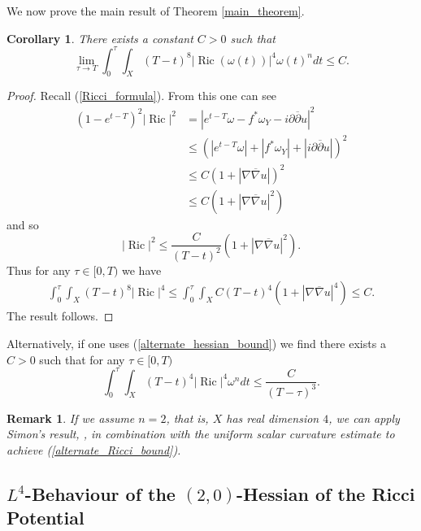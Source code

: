 \documentclass[12pt]{article}
\newtheorem{corollary}[theorem]{Corollary}
\newtheorem{remark}[theorem]{Remark}
\numberwithin{equation}{section}
\renewcommand{\d}{\partial}
\newcommand{\dbar}{\overline{\partial}}
\DeclareMathOperator{\Ric}{Ric}
\newcommand{\oo}[1]{\overline{#1}}
\begin{document}
\noindent We now prove the main result of Theorem \ref{main_theorem}. 

\begin{corollary}
There exists a constant $C > 0$ such that
\begin{equation}\label{Ricci_bound}
    \lim_{\tau \to T} \int_0^\tau \int_X (T-t)^8|\Ric(\omega(t))|^4 \omega(t)^n dt \leq C.
\end{equation}
\end{corollary}

\begin{proof}
Recall (\ref{Ricci_formula}). From this one can see
\begin{align*}
    (1-e^{t-T})^2|\Ric|^2 &= |e^{t-T}\omega-f^*\omega_Y -i\d\dbar u|^2\\
    &\leq (|e^{t-T} \omega| + |f^*\omega_Y| + |i\d\dbar u|)^2\\
    &\leq C(1 + |\nabla \oo{\nabla} u|)^2\\
    &\leq C (1 + |\nabla \oo{\nabla} u|^2)
\end{align*}
and so
\begin{equation*}
    |\Ric|^2 \leq \frac{C}{(T-t)^2} (1+|\nabla \oo{\nabla} u|^2).
\end{equation*}
Thus for any $\tau \in [0,T)$ we have
\begin{align*}
    \int_0^\tau \int_X (T-t)^8 |\Ric|^4 \leq \int_0^\tau \int_X C(T-t)^4(1+|\nabla\oo{\nabla} u|^4) \leq C.
\end{align*}
The result follows.
\end{proof}

\noindent Alternatively, if one uses (\ref{alternate_hessian_bound}) we find there exists a $C >0$ such that for any $\tau \in [0,T)$
\begin{equation}\label{alternate_Ricci_bound}
    \int_0^\tau \int_X (T-t)^4 |\Ric|^4\omega^n dt \leq \frac{C}{(T-\tau)^3}.
\end{equation}

\begin{remark}
If we assume $n=2$, that is, $X$ has real dimension $4$, we can apply Simon's result, \cite[Thm 1.1]{S15}, in combination with the uniform scalar curvature estimate to achieve (\ref{alternate_Ricci_bound}).
\end{remark}

\subsection{$L^4$-Behaviour of the $(2,0)$-Hessian of the Ricci Potential}
\end{document}
